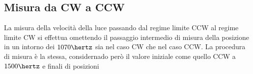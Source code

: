 \subsection{Misura da CW a CCW}
La misura della velocità della luce passando dal regime limite CCW al regime limite CW si effettua omettendo il passaggio intermedio di misura della posizione in un intorno \Delta\nu dei $1070\hertz$ sia nel caso CW che nel caso CCW.
La procedura di misura è la stessa, considernado però il  valore iniziale come quello CCW a $1500\hertz$  e finali di posizioni 
